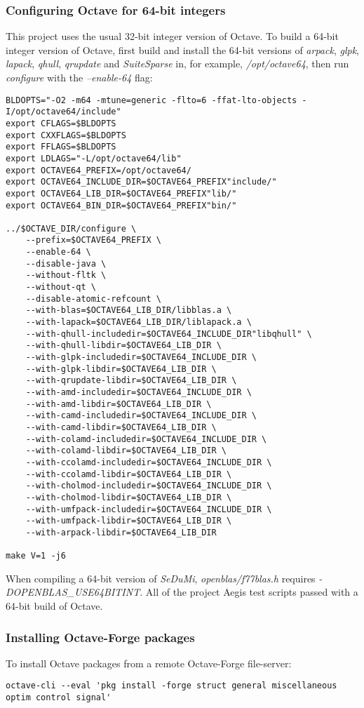 \documentclass[a4paper,twoside,10pt,english]{report}
\begin{document}
\subsubsection*{Configuring Octave for 64-bit integers}
This project uses the usual 32-bit integer version of Octave.
To build a 64-bit integer version of Octave, first build and install the 
64-bit versions of \emph{arpack}, \emph{glpk}, \emph{lapack}, \emph{qhull}, 
\emph{qrupdate} and \emph{SuiteSparse} in, for example, \emph{/opt/octave64},
then run \emph{configure} with the \emph{--enable-64} flag:
\begin{small}
\begin{verbatim}
BLDOPTS="-O2 -m64 -mtune=generic -flto=6 -ffat-lto-objects -I/opt/octave64/include"
export CFLAGS=$BLDOPTS 
export CXXFLAGS=$BLDOPTS 
export FFLAGS=$BLDOPTS
export LDLAGS="-L/opt/octave64/lib"
export OCTAVE64_PREFIX=/opt/octave64/
export OCTAVE64_INCLUDE_DIR=$OCTAVE64_PREFIX"include/"
export OCTAVE64_LIB_DIR=$OCTAVE64_PREFIX"lib/"
export OCTAVE64_BIN_DIR=$OCTAVE64_PREFIX"bin/"

../$OCTAVE_DIR/configure \
    --prefix=$OCTAVE64_PREFIX \
    --enable-64 \
    --disable-java \
    --without-fltk \
    --without-qt \
    --disable-atomic-refcount \
    --with-blas=$OCTAVE64_LIB_DIR/libblas.a \
    --with-lapack=$OCTAVE64_LIB_DIR/liblapack.a \
    --with-qhull-includedir=$OCTAVE64_INCLUDE_DIR"libqhull" \
    --with-qhull-libdir=$OCTAVE64_LIB_DIR \
    --with-glpk-includedir=$OCTAVE64_INCLUDE_DIR \
    --with-glpk-libdir=$OCTAVE64_LIB_DIR \
    --with-qrupdate-libdir=$OCTAVE64_LIB_DIR \
    --with-amd-includedir=$OCTAVE64_INCLUDE_DIR \
    --with-amd-libdir=$OCTAVE64_LIB_DIR \
    --with-camd-includedir=$OCTAVE64_INCLUDE_DIR \
    --with-camd-libdir=$OCTAVE64_LIB_DIR \
    --with-colamd-includedir=$OCTAVE64_INCLUDE_DIR \
    --with-colamd-libdir=$OCTAVE64_LIB_DIR \
    --with-ccolamd-includedir=$OCTAVE64_INCLUDE_DIR \
    --with-ccolamd-libdir=$OCTAVE64_LIB_DIR \
    --with-cholmod-includedir=$OCTAVE64_INCLUDE_DIR \
    --with-cholmod-libdir=$OCTAVE64_LIB_DIR \
    --with-umfpack-includedir=$OCTAVE64_INCLUDE_DIR \
    --with-umfpack-libdir=$OCTAVE64_LIB_DIR \
    --with-arpack-libdir=$OCTAVE64_LIB_DIR

make V=1 -j6
\end{verbatim}
\end{small}
When compiling a 64-bit version of \emph{SeDuMi}, \emph{openblas/f77blas.h} 
requires \emph{-DOPENBLAS\_USE64BITINT}. 
All of the project Aegis test scripts passed with a 64-bit build of Octave.
\subsubsection*{Installing Octave-Forge packages}
To install Octave packages from a remote Octave-Forge file-server:
\begin{small}
\begin{verbatim}
octave-cli --eval 'pkg install -forge struct general miscellaneous optim control signal'
\end{verbatim}
\end{small}
\end{document}
